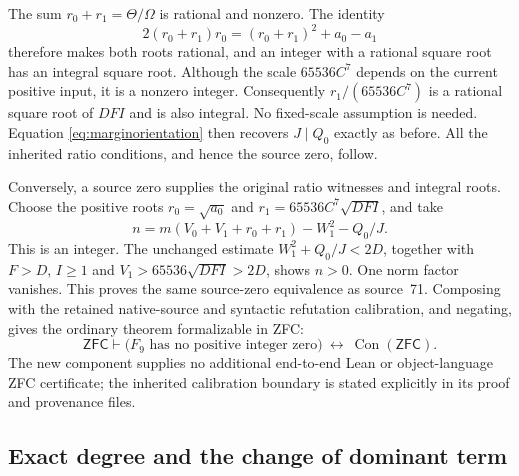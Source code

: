 The sum $r_0+r_1=\Theta/\Omega$ is rational and nonzero.  The identity
\[
 2(r_0+r_1)r_0=(r_0+r_1)^2+a_0-a_1
\]
therefore makes both roots rational, and an integer with a rational square
root has an integral square root.  Although the scale
$65536C^7$ depends on the current positive input, it is a nonzero integer.
Consequently $r_1/(65536C^7)$ is a rational square root of $DFI$ and is
also integral.  No fixed-scale assumption is needed.  Equation
\eqref{eq:marginorientation} then recovers $J\mid Q_0$ exactly as before.
All the inherited ratio conditions, and hence the source zero, follow.

Conversely, a source zero supplies the original ratio witnesses and
integral roots.  Choose the positive roots
$r_0=\sqrt{a_0}$ and $r_1=65536C^7\sqrt{DFI}$, and take
\[
 n=m(V_0+V_1+r_0+r_1)-W_1^2-Q_0/J.
\]
This is an integer.  The unchanged estimate $W_1^2+Q_0/J<2D$, together
with $F>D$, $I\geq1$ and $V_1>65536\sqrt{DFI}>2D$, shows $n>0$.
One norm factor vanishes.  This proves the same source-zero equivalence
as source~71.  Composing with the retained native-source and syntactic
refutation calibration, and negating, gives the ordinary theorem
formalizable in ZFC:
\[
 \mathsf{ZFC}\vdash
 \bigl(\text{$F_9$ has no positive integer zero}\bigr)
       \ \longleftrightarrow\ \operatorname{Con}(\mathsf{ZFC}).
\]
The new component supplies no additional end-to-end Lean or
object-language ZFC certificate; the inherited calibration boundary is
stated explicitly in its proof and provenance files.

\subsection{Exact degree and the change of dominant term}

